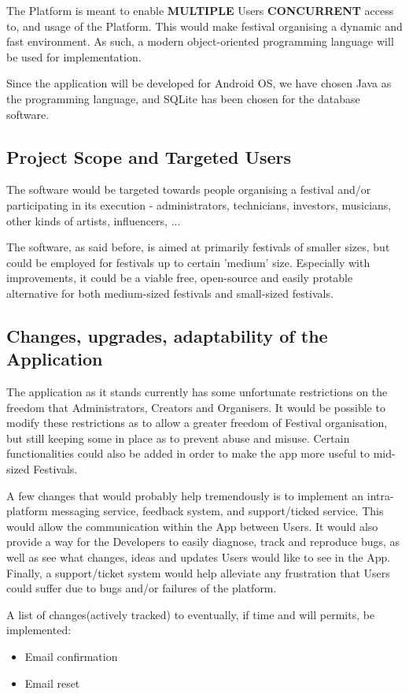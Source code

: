	 The Platform is meant to enable \textbf{MULTIPLE} Users \textbf{CONCURRENT} access to, and usage of the Platform. This would make festival organising a dynamic and fast environment. As such, a modern object-oriented programming language will be used for implementation.
	
	 Since the application will be developed for Android OS, we have chosen Java as the programming language, and SQLite has been chosen for the database software.
	
	\subsection{Project Scope and Targeted Users}
	 The software would be targeted towards people organising a festival and/or participating in its execution - administrators, technicians, investors, musicians, other kinds of artists, influencers, ...
	
	 The software, as said before, is aimed at primarily festivals of smaller sizes, but could be employed for festivals up to certain 'medium' size. Especially with improvements, it could be a viable free, open-source and easily protable alternative for both medium-sized festivals and small-sized festivals.
	
	\subsection{Changes, upgrades, adaptability of the Application}
	 The application as it stands currently has some unfortunate restrictions on the freedom that Administrators, Creators and Organisers. It would be possible to modify these restrictions as to allow a greater freedom of Festival organisation, but still keeping some in place as to prevent abuse and misuse. Certain functionalities could also be added in order to make the app more useful to mid-sized Festivals.
	
	 A few changes that would probably help tremendously is to implement an intra-platform messaging service, feedback system, and support/ticked service. This would allow the communication within the App between Users. It would also provide a way for the Developers to easily diagnose, track and reproduce bugs, as well as see what changes, ideas and updates Users would like to see in the App. Finally, a support/ticket system would help alleviate any frustration that Users could suffer due to bugs and/or failures of the platform.
	
	 A list of changes(actively tracked) to eventually, if time and will permits, be implemented:
	\begin{itemize}
		\item Email confirmation
		\item Email reset
	\end{itemize}
\eject

